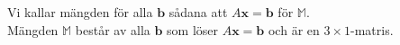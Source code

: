 Vi kallar mängden för alla $\bm{b}$ sådana att $A\bm{x}=\bm{b}$ för $\mathbb{M}$.\\
Mängden $\mathbb{M}$ består av alla $\bm{b}$ som löser $A\bm{x}=\bm{b}$ och är en $3\times 1$-matris.